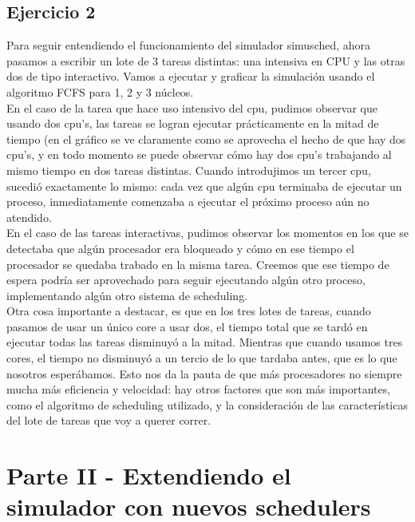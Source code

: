 \documentclass[a4paper]{article}
\begin{document}
\subsection{Ejercicio 2}
Para seguir entendiendo el funcionamiento del simulador simusched, ahora pasamos a escribir un lote
de 3 tareas distintas: una intensiva en CPU y las otras dos de tipo interactivo. Vamos a ejecutar y
graficar la simulaci\'on usando el algoritmo FCFS para 1, 2 y 3 n\'ucleos. \\
En el caso de la tarea que hace uso intensivo del cpu, pudimos observar que usando dos cpu's, las
tareas se logran ejecutar pr\'acticamente en la mitad de tiempo (en el gr\'afico se ve claramente como
se aprovecha el hecho de que hay dos cpu's, y en todo momento se puede observar c\'omo hay dos cpu's 
trabajando al mismo tiempo en dos tareas distintas. Cuando introdujimos un tercer cpu, sucedi\'o 
exactamente lo mismo: cada vez que alg\'un cpu terminaba de ejecutar un proceso, inmediatamente
comenzaba a ejecutar el pr\'oximo proceso a\'un no atendido. \\
En el caso de las tareas interactivas, pudimos observar los momentos en los que se detectaba que 
alg\'un procesador era bloqueado y c\'omo en ese tiempo el procesador se quedaba trabado en la misma 
tarea. Creemos que ese tiempo de espera podr\'ia ser aprovechado para seguir ejecutando alg\'un otro
proceso, implementando alg\'un otro sistema de scheduling. \\
Otra cosa importante a destacar, es que en los tres lotes de tareas, cuando pasamos de usar un \'unico
core a usar dos, el tiempo total que se tard\'o en ejecutar todas las tareas disminuy\'o a la mitad.
Mientras que cuando usamos tres cores, el tiempo no disminuy\'o a un tercio de lo que tardaba antes,
que es lo que nosotros esper\'abamos. Esto nos da la pauta de que m\'as procesadores no siempre
mucha m\'as eficiencia y velocidad: hay otros factores que son m\'as importantes, como el algoritmo de
scheduling utilizado, y la consideraci\'on de las caracter\'isticas del lote de tareas que voy a querer
correr. \\


\section{Parte II - Extendiendo el simulador con nuevos schedulers}
\end{document}
